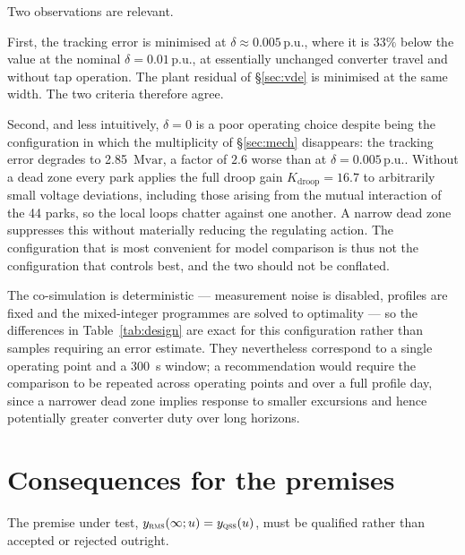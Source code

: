 \documentclass[11pt,a4paper]{article}
\newcommand{\pu}{\ensuremath{\mathrm{p.u.}}}
\newcommand{\Mvar}{\ensuremath{\mathrm{Mvar}}}
\newcommand{\qss}{\textsc{qss}}
\newcommand{\rms}{\textsc{rms}}
\begin{document}
Two observations are relevant.

First, the tracking error is minimised at $\delta \approx 0.005\,\pu$, where
it is $33\%$ below the value at the nominal $\delta = 0.01\,\pu$, at
essentially unchanged converter travel and without tap operation. The plant
residual of \S\ref{sec:vde} is minimised at the same width. The two criteria
therefore agree.

Second, and less intuitively, $\delta = 0$ is a poor operating choice
despite being the configuration in which the multiplicity of \S\ref{sec:mech}
disappears: the tracking error degrades to \SI{2.85}{\Mvar}, a factor of
$2.6$ worse than at $\delta = 0.005\,\pu$. Without a dead zone every park
applies the full droop gain $K_{\mathrm{droop}} = 16.7$ to arbitrarily small
voltage deviations, including those arising from the mutual interaction of
the 44 parks, so the local loops chatter against one another. A narrow dead
zone suppresses this without materially reducing the regulating action. The
configuration that is most convenient for model comparison is thus not the
configuration that controls best, and the two should not be conflated.

The co-simulation is deterministic --- measurement noise is disabled,
profiles are fixed and the mixed-integer programmes are solved to optimality
--- so the differences in Table~\ref{tab:design} are exact for this
configuration rather than samples requiring an error estimate. They
nevertheless correspond to a single operating point and a \SI{300}{\second}
window; a recommendation would require the comparison to be repeated across
operating points and over a full profile day, since a narrower dead zone
implies response to smaller excursions and hence potentially greater
converter duty over long horizons.

\section{Consequences for the premises}

The premise under test, $y_{\rms}(\infty; u) = y_{\qss}(u)$, must be
qualified rather than accepted or rejected outright.
\end{document}
